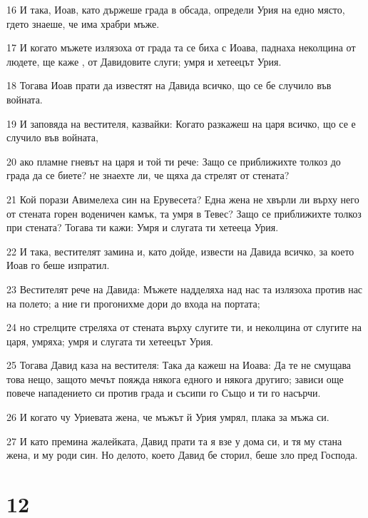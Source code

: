\par 16 И така, Иоав, като държеше града в обсада, определи Урия на едно място, гдето знаеше, че има храбри мъже.
\par 17 И когато мъжете излязоха от града та се биха с Иоава, паднаха неколцина от людете, ще каже , от Давидовите слуги; умря и хетеецът Урия.
\par 18 Тогава Иоав прати да известят на Давида всичко, що се бе случило във войната.
\par 19 И заповяда на вестителя, казвайки: Когато разкажеш на царя всичко, що се е случило във войната,
\par 20 ако пламне гневът на царя и той ти рече: Защо се приближихте толкоз до града да се биете? не знаехте ли, че щяха да стрелят от стената?
\par 21 Кой порази Авимелеха син на Ерувесета? Една жена не хвърли ли върху него от стената горен воденичен камък, та умря в Тевес? Защо се приближихте толкоз при стената? Тогава ти кажи: Умря и слугата ти хетееца Урия.
\par 22 И така, вестителят замина и, като дойде, извести на Давида всичко, за което Иоав го беше изпратил.
\par 23 Вестителят рече на Давида: Мъжете надделяха над нас та излязоха против нас на полето; а ние ги прогонихме дори до входа на портата;
\par 24 но стрелците стреляха от стената върху слугите ти, и неколцина от слугите на царя, умряха; умря и слугата ти хетеецът Урия.
\par 25 Тогава Давид каза на вестителя: Така да кажеш на Иоава: Да те не смущава това нещо, защото мечът пояжда някога едного и някога другиго; зависи още повече нападението си против града и съсипи го Също и ти го насърчи.
\par 26 И когато чу Уриевата жена, че мъжът й Урия умрял, плака за мъжа си.
\par 27 И като премина жалейката, Давид прати та я взе у дома си, и тя му стана жена, и му роди син. Но делото, което Давид бе сторил, беше зло пред Господа.

\chapter{12}

